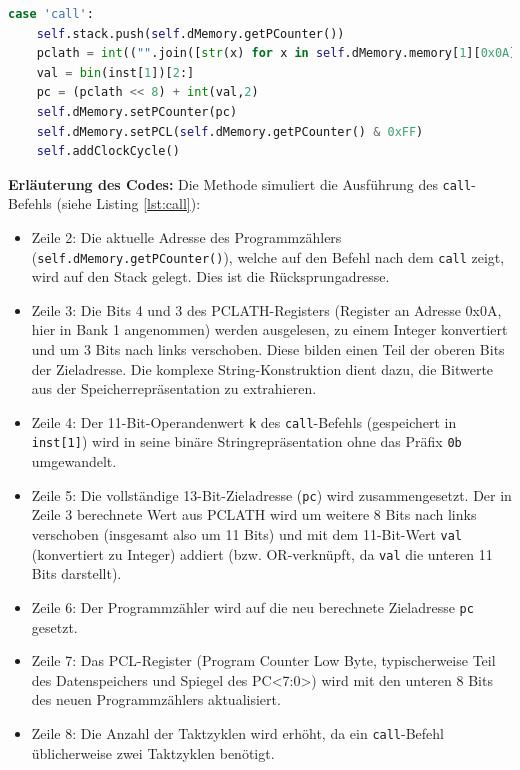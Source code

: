 \begin{lstlisting}[language=Python, caption={Ausschnitt der CALL-Befehlsimplementierung im \acl{CPU} Modul}, label={lst:call}]
case 'call':
    self.stack.push(self.dMemory.getPCounter())
    pclath = int(("".join([str(x) for x in self.dMemory.memory[1][0x0A]])[3:5]),2) << 3
    val = bin(inst[1])[2:]
    pc = (pclath << 8) + int(val,2)
    self.dMemory.setPCounter(pc)
    self.dMemory.setPCL(self.dMemory.getPCounter() & 0xFF)
    self.addClockCycle()
\end{lstlisting}

\textbf{Erläuterung des Codes:}
Die Methode simuliert die Ausführung des \texttt{call}-Befehls (siehe Listing \ref{lst:call}):
\begin{itemize}
    \item Zeile 2: Die aktuelle Adresse des Programmzählers (\texttt{self.dMemory.getPCounter()}), welche auf den Befehl nach dem \texttt{call} zeigt, wird auf den Stack gelegt. Dies ist die Rücksprungadresse.
    \item Zeile 3: Die Bits 4 und 3 des PCLATH-Registers (Register an Adresse 0x0A, hier in Bank 1 angenommen) werden ausgelesen, zu einem Integer konvertiert und um 3 Bits nach links verschoben. Diese bilden einen Teil der oberen Bits der Zieladresse. Die komplexe String-Konstruktion dient dazu, die Bitwerte aus der Speicherrepräsentation zu extrahieren.
    \item Zeile 4: Der 11-Bit-Operandenwert \texttt{k} des \texttt{call}-Befehls (gespeichert in \texttt{inst[1]}) wird in seine binäre Stringrepräsentation ohne das Präfix \texttt{0b} umgewandelt.
    \item Zeile 5: Die vollständige 13-Bit-Zieladresse (\texttt{pc}) wird zusammengesetzt. Der in Zeile 3 berechnete Wert aus PCLATH wird um weitere 8 Bits nach links verschoben (insgesamt also um 11 Bits) und mit dem 11-Bit-Wert \texttt{val} (konvertiert zu Integer) addiert (bzw. OR-verknüpft, da \texttt{val} die unteren 11 Bits darstellt).
    \item Zeile 6: Der Programmzähler wird auf die neu berechnete Zieladresse \texttt{pc} gesetzt.
    \item Zeile 7: Das PCL-Register (Program Counter Low Byte, typischerweise Teil des Datenspeichers und Spiegel des PC<7:0>) wird mit den unteren 8 Bits des neuen Programmzählers aktualisiert.
    \item Zeile 8: Die Anzahl der Taktzyklen wird erhöht, da ein \texttt{call}-Befehl üblicherweise zwei Taktzyklen benötigt.
\end{itemize}

